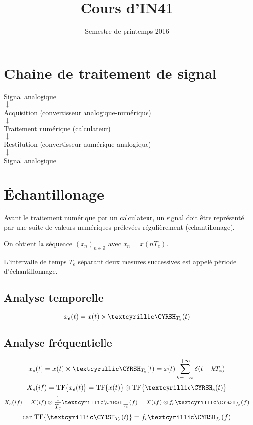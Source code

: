 \documentclass[a4paper,12pt]{article}
\title{Cours d'IN41}{Chapitre 4 -- Numérisation des signaux}
\author{}
\date{Semestre de printemps 2016}
\begin{document}
\maketitlepage

\tableofcontents
\pagebreak

\section{Chaine de traitement de signal}

\begin{center}
    Signal analogique \\
    $\downarrow$ \\
    Acquisition (convertisseur analogique-numérique) \\
    $\downarrow$ \\
    Traitement numérique (calculateur) \\
    $\downarrow$ \\
    Restitution (convertisseur numérique-analogique) \\
    $\downarrow$ \\
    Signal analogique
\end{center}

\section{Échantillonage}

Avant le traitement numérique par un calculateur, un signal doit être représenté par une suite de valeurs numériques prélevées régulièrement (échantillonage).

On obtient la séquence $(x_n)_{n \in \mathbb{Z}}$ avec $x_n = x(nT_e)$.

L'intervalle de temps $T_e$ séparant deux mesures successives est appelé période d'échantillonnage.

\subsection{Analyse temporelle}

\[ x_e(t) = x(t) \times \dirac_{T_e}(t) \]

\subsection{Analyse fréquentielle}

\[ x_e(t) = x(t) \times \dirac_{T_e}(t) = x(t) \sum_{k = -\infty}^{+\infty} \delta(t-kT_e) \]
\[ X_e(if) = \TF{ x_e(t)} = \TF{ x(t)} \otimes \TF{ \dirac_e(t)} \]
\[ X_e(if) = X(if) \otimes \dfrac{1}{T_e} \dirac_{\frac{1}{T_e}}(f) = X(if) \otimes f_e \dirac_{f_e}(f) \]
\[ \text{car } \TF{\dirac_{T_e}(t)} = f_e \dirac_{f_e}(f) \]
\end{document}
